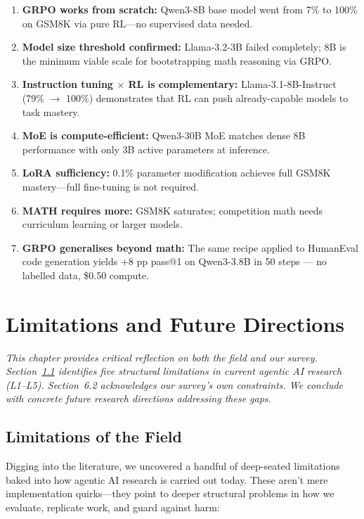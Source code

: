 \documentclass[12pt,a4paper]{report}
\theoremstyle{definition}
\begin{document}
\begin{tcolorbox}[colback=purple!5!white, colframe=purple!60!black, title=\textbf{Chapter 5 Key Takeaways (Empirical)}]
\begin{enumerate}
    \item \textbf{GRPO works from scratch:} Qwen3-8B base model went from 7\% to 100\% on GSM8K via pure RL---no supervised data needed.
    \item \textbf{Model size threshold confirmed:} Llama-3.2-3B failed completely; 8B is the minimum viable scale for bootstrapping math reasoning via GRPO.
    \item \textbf{Instruction tuning $\times$ RL is complementary:} Llama-3.1-8B-Instruct (79\% $\rightarrow$ 100\%) demonstrates that RL can push already-capable models to task mastery.
    \item \textbf{MoE is compute-efficient:} Qwen3-30B MoE matches dense 8B performance with only 3B active parameters at inference.
    \item \textbf{LoRA sufficiency:} 0.1\% parameter modification achieves full GSM8K mastery---full fine-tuning is not required.
    \item \textbf{MATH requires more:} GSM8K saturates; competition math needs curriculum learning or larger models.
    \item \textbf{GRPO generalises beyond math:} The same recipe applied to HumanEval code generation yields +8 pp pass@1 on Qwen3-3.8B in 50 steps --- no labelled data, \$0.50 compute.
\end{enumerate}
\end{tcolorbox}



\chapter{Limitations and Future Directions}
\label{ch:limitations}

\textit{This chapter provides critical reflection on both the field and our survey. Section~\ref{sec:field-limitations} identifies five structural limitations in current agentic AI research (L1--L5). Section~6.2 acknowledges our survey's own constraints. We conclude with concrete future research directions addressing these gaps.}

\vspace{0.3cm}
\section{Limitations of the Field}
\label{sec:field-limitations}
Digging into the literature, we uncovered a handful of deep-seated limitations baked into how agentic AI research is carried out today. These aren't mere implementation quirks---they point to deeper structural problems in how we evaluate, replicate work, and guard against harm:
\end{document}
